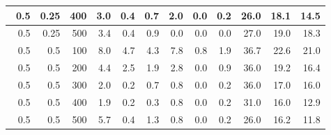 \begin{longtable}{|r|r|r|r|r|r|r|r|r|r|r|r|}
        \hline \
        0.5                            & 0.25                     & 400                       & 3.0                       & 0.4                       & 0.7                       & 2.0                       & 0.0                       & 0.2                       & 26.0                      & 18.1                      & 14.5                      \\
        \hline \
        0.5                            & 0.25                     & 500                       & 3.4                       & 0.4                       & 0.9                       & 0.0                       & 0.0                       & 0.0                       & 27.0                      & 19.0                      & 18.3                      \\
        \hline \
        0.5                            & 0.5                     & 100                       & 8.0                       & 4.7                       & 4.3                       & 7.8                       & 0.8                       & 1.9                       & 36.7                      & 22.6                      & 21.0                      \\
        \hline \
        0.5                            & 0.5                     & 200                       & 4.4                       & 2.5                       & 1.9                       & 2.8                       & 0.0                       & 0.9                       & 36.0                      & 19.2                      & 16.4                      \\
        \hline \
        0.5                            & 0.5                     & 300                       & 2.0                       & 0.2                       & 0.7                       & 0.8                       & 0.0                       & 0.2                       & 36.0                      & 17.0                      & 16.0                      \\
        \hline \
        0.5                            & 0.5                    & 400                       & 1.9                       & 0.2                       & 0.3                       & 0.8                       & 0.0                       & 0.2                       & 31.0                      & 16.0                      & 12.9                      \\
        \hline \
        0.5                            & 0.5                    & 500                       & 5.7                       & 0.4                       & 1.3                       & 0.8                       & 0.0                       & 0.2                       & 26.0                      & 16.2                      & 11.8                      \\

\end{longtable}
